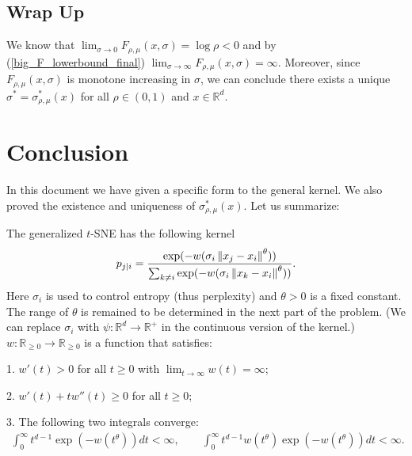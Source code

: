\documentclass[10pt]{article}
\begin{document}
\subsection*{Wrap Up}
We know that $\lim_{\sigma \to 0}F_{\rho,\mu}(x,\sigma) = \log \rho <0$ and by
(\ref{big_F_lowerbound_final}) $\lim_{\sigma \to \infty}F_{\rho,\mu}(x,\sigma)
    = \infty$. Moreover, since $F_{\rho,\mu}(x,\sigma)$ is monotone increasing in
$\sigma$, we can conclude there exists a unique $\sigma^* =
    \sigma_{\rho,\mu}^*(x)$ for all $\rho \in (0,1)$ and $x \in \mathbb{R}^d$.
\section{Conclusion}
In this document we have given a specific form to the general kernel. We also
proved the existence and uniqueness of $\sigma_{\rho,\mu}^*(x)$. Let us
summarize:

The generalized $t$-SNE has the following kernel
\begin{align}
    p_{j|i} = \frac{\exp(-w(\sigma_i\left\lVert x_j-x_i\right\rVert^{\theta}))}{\sum_{k \neq i}\exp(-w(\sigma_i\left\lVert x_k-x_i\right\rVert^{\theta}))}.
\end{align}
Here $\sigma_i$ is used to control entropy (thus perplexity) and $\theta>0$ is a fixed constant. The range of $\theta$ is remained to be determined in the next part of the problem. (We can replace $\sigma_i$ with $\psi: \mathbb{R}^d \to \mathbb{R}^+$ in the continuous version of the kernel.) $w:\mathbb{R}_{\geq 0} \to \mathbb{R}_{\geq 0}$ is a function that satisfies:

1. $w'(t)>0$ for all $t \geq 0$ with $\lim_{t \to \infty} w(t) = \infty$;

2. $w'(t)+tw''(t) \geq 0$ for all $t \geq 0$;

3. The following two integrals converge:
\begin{align}
    \int_0^{\infty} t^{d-1}\exp(-w(t^{\theta}))dt < \infty, \qquad \int_0^{\infty} t^{d-1} w(t^{\theta}) \exp(-w(t^{\theta}))dt < \infty.
\end{align}

 \nocite{*} 
\end{document}
